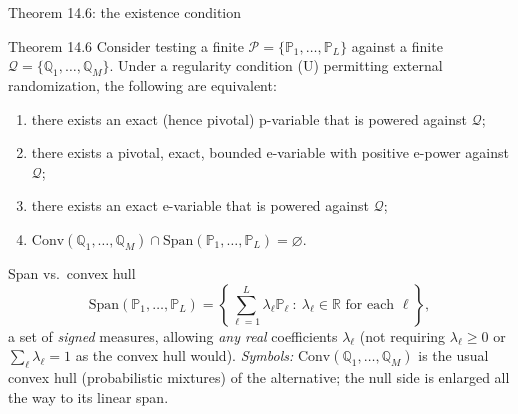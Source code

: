 \documentclass[aspectratio=169,10pt]{beamer}
\newcommand{\PP}{\mathbb{P}}
\newcommand{\QQ}{\mathbb{Q}}
\newcommand{\RR}{\mathbb{R}}
\newcommand{\calP}{\mathcal{P}}
\newcommand{\calQ}{\mathcal{Q}}
\newcommand{\Conv}{\mathrm{Conv}}
\newcommand{\Span}{\mathrm{Span}}
\begin{document}
\begin{frame}[allowframebreaks]{Theorem 14.6: the existence condition}
  \begin{block}{Theorem 14.6}
    Consider testing a finite $\calP=\{\PP_1,\dots,\PP_L\}$ against a
    finite $\calQ=\{\QQ_1,\dots,\QQ_M\}$. Under a regularity condition
    (U) permitting external randomization, the following are equivalent:
    \begin{enumerate}
      \item[(i)] there exists an exact (hence pivotal) p-variable that is
        powered against $\calQ$;
      \item[(ii)] there exists a pivotal, exact, bounded e-variable with
        positive e-power against $\calQ$;
      \item[(iii)] there exists an exact e-variable that is powered
        against $\calQ$;
      \item[(iv)] $\Conv(\QQ_1,\dots,\QQ_M) \cap \Span(\PP_1,\dots,\PP_L) = \varnothing$.
    \end{enumerate}
  \end{block}

  \begin{block}{Span vs.\ convex hull}
    \[
      \Span(\PP_1,\dots,\PP_L) = \left\{ \sum_{\ell=1}^L \lambda_\ell \PP_\ell \ :\ \lambda_\ell \in \RR \text{ for each } \ell \right\},
    \]
    a set of \emph{signed} measures, allowing \emph{any real} coefficients
    $\lambda_\ell$ (not requiring $\lambda_\ell\geq 0$ or $\sum_\ell\lambda_\ell=1$
    as the convex hull would). \emph{Symbols:} $\Conv(\QQ_1,\dots,\QQ_M)$
    is the usual convex hull (probabilistic mixtures) of the alternative;
    the null side is enlarged all the way to its linear span.
  \end{block}

  \framebreak


\end{frame}
\end{document}
